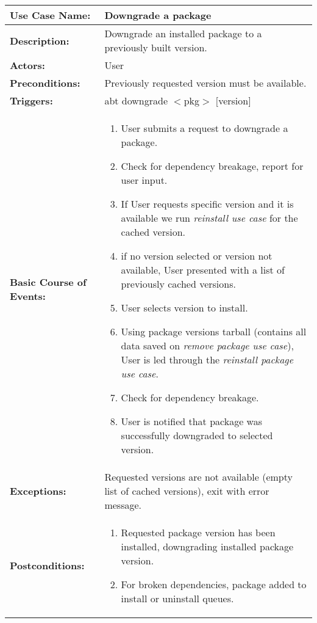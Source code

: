 
\begin{tabularx}{\linewidth}{|l|X|}
\hline
\textbf{Use Case Name:} & \textbf{Downgrade a package} \\
\hline
\textbf{Description:} & 
Downgrade an installed package to a previously built version. \\
\hline
\textbf{Actors:} & User \\
\hline
\textbf{Preconditions:} & Previously requested version must be available. \\
\hline
\textbf{Triggers:} & abt downgrade $<$pkg$>$ $[$version$]$ \\
\hline
\textbf{Basic Course of Events:} & 
\begin{minipage}{\linewidth} 
  \vspace{0.05em}
  \begin{enumerate}
    \item User submits a request to downgrade a package.
    \item Check for dependency breakage, report for user input.
    \item If User requests specific version and it is available we run \emph{reinstall use case} for the cached version.
    \item if no version selected or version not available, User presented with a list of previously cached versions.
    \item User selects version to install.
    \item Using package versions tarball (contains all data saved on \emph{remove package use case}), User is led through the \emph{reinstall package use case}.
    \item Check for dependency breakage.
    \item User is notified that package was successfully downgraded to selected version.
  \end{enumerate}
  \vspace{0.05em}
\end{minipage}
\\
\hline 
\textbf{Exceptions:} & 
Requested versions are not available (empty list of cached versions), exit with error message.
\\
\hline 
\textbf{Postconditions:} &
\begin{minipage}{\linewidth}
  \vspace{0.05em}
  \begin{enumerate}
    \item Requested package version has been installed, downgrading installed package version.
    \item For broken dependencies, package added to install or uninstall queues.
  \end{enumerate}
  \vspace{0.05em}
\end{minipage}
\\
\hline
\end{tabularx}


